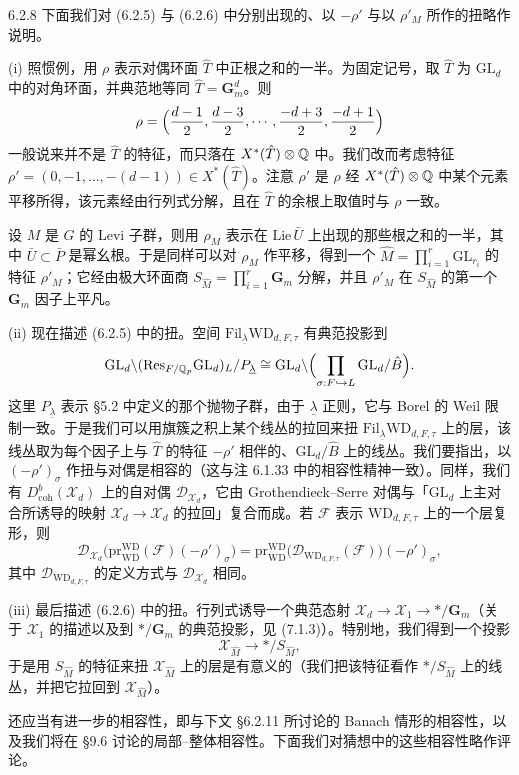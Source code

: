 \begin{rem}{6.2.8}
下面我们对 (6.2.5) 与 (6.2.6) 中分别出现的、以 $-\rho'$ 与以 $\rho'_M$ 所作的扭略作说明。

(i) 照惯例，用 $\rho$ 表示对偶环面 $\hat T$ 中正根之和的一半。为固定记号，取 $\hat T$ 为 $\mathrm{GL}_d$ 中的对角环面，并典范地等同 $\hat T=\mathbf G_m^d$。则
\[
\rho=\Bigl(\frac{d-1}{2},\frac{d-3}{2},\cdots,\frac{-d+3}{2},\frac{-d+1}{2}\Bigr)
\]
一般说来并不是 $\hat T$ 的特征，而只落在 $X^*(\hat T)\otimes\mathbb{Q}$ 中。我们改而考虑特征 $\rho'=(0,-1,\dots,-(d-1))\in X^*(\hat T)$。注意 $\rho'$ 是 $\rho$ 经 $X^*(\hat T)\otimes\mathbb{Q}$ 中某个元素平移所得，该元素经由行列式分解，且在 $\hat T$ 的余根上取值时与 $\rho$ 一致。

设 $M$ 是 $G$ 的 Levi 子群，则用 $\rho_M$ 表示在 $\mathrm{Lie}\,\bar U$ 上出现的那些根之和的一半，其中 $\bar U\subset\bar P$ 是幂幺根。于是同样可以对 $\rho_M$ 作平移，得到一个 $\hat M=\prod_{i=1}^r\mathrm{GL}_{r_i}$ 的特征 $\rho'_M$；它经由极大环面商 $S_{\hat M}=\prod_{i=1}^r\mathbf G_m$ 分解，并且 $\rho'_M$ 在 $S_{\hat M}$ 的第一个 $\mathbf G_m$ 因子上平凡。

(ii) 现在描述 (6.2.5) 中的扭。空间 $\mathrm{Fil}_{\underline\lambda}\mathrm{WD}_{d,F,\tau}$ 有典范投影到
\[
\mathrm{GL}_d\backslash(\mathrm{Res}_{F/\mathbb{Q}_p}\mathrm{GL}_d)_L/P_{\underline\lambda}
\cong\mathrm{GL}_d\backslash\Bigl(\prod_{\sigma:F\hookrightarrow L}\mathrm{GL}_d/\hat B\Bigr).
\]
这里 $P_{\underline\lambda}$ 表示 §5.2 中定义的那个抛物子群，由于 $\underline\lambda$ 正则，它与 Borel 的 Weil 限制一致。于是我们可以用旗簇之积上某个线丛的拉回来扭 $\mathrm{Fil}_{\underline\lambda}\mathrm{WD}_{d,F,\tau}$ 上的层，该线丛取为每个因子上与 $\hat T$ 的特征 $-\rho'$ 相伴的、$\mathrm{GL}_d/\hat B$ 上的线丛。我们要指出，以 $(-\rho')_\sigma$ 作扭与对偶是相容的（这与注 6.1.33 中的相容性精神一致）。同样，我们有 $D^b_{\mathrm{coh}}(\mathcal X_d)$ 上的自对偶 $\mathcal D_{\mathcal X_d}$，它由 Grothendieck--Serre 对偶与「$\mathrm{GL}_d$ 上主对合所诱导的映射 $\mathcal X_d\to\mathcal X_d$ 的拉回」复合而成。若 $\mathcal F$ 表示 $\mathrm{WD}_{d,F,\tau}$ 上的一个层复形，则
\[
\mathcal D_{\mathcal X_d}\bigl(\mathrm{pr}^{\mathrm{WD}}_{\mathrm{WD}}(\mathcal F)(-\rho')_\sigma\bigr)
=\mathrm{pr}^{\mathrm{WD}}_{\mathrm{WD}}\bigl(\mathcal D_{\mathrm{WD}_{d,F,\tau}}(\mathcal F)\bigr)(-\rho')_\sigma,
\]
其中 $\mathcal D_{\mathrm{WD}_{d,F,\tau}}$ 的定义方式与 $\mathcal D_{\mathcal X_d}$ 相同。

(iii) 最后描述 (6.2.6) 中的扭。行列式诱导一个典范态射 $\mathcal X_d\to\mathcal X_1\to*/\mathbf G_m$（关于 $\mathcal X_1$ 的描述以及到 $*/\mathbf G_m$ 的典范投影，见 (7.1.3)）。特别地，我们得到一个投影
\[
\mathcal X_{\hat M}\to*/S_{\hat M},
\]
于是用 $S_{\hat M}$ 的特征来扭 $\mathcal X_{\hat M}$ 上的层是有意义的（我们把该特征看作 $*/S_{\hat M}$ 上的线丛，并把它拉回到 $\mathcal X_{\hat M}$）。

还应当有进一步的相容性，即与下文 §6.2.11 所讨论的 Banach 情形的相容性，以及我们将在 §9.6 讨论的局部--整体相容性。下面我们对猜想中的这些相容性略作评论。
\end{rem}


